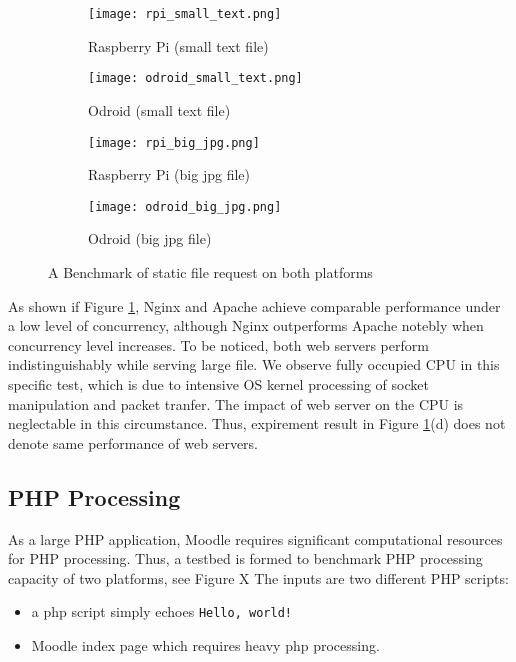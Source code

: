 \begin{figure}[h]
\centering
\begin{subfigure}{0.45\textwidth}
\centering
\texttt{[image: rpi\_small\_text.png]}
\caption{Raspberry Pi (small text file)}
\end{subfigure}
\begin{subfigure}{0.45\textwidth}
\centering
\texttt{[image: odroid\_small\_text.png]}
\caption{Odroid (small text file)}
\end{subfigure}

\begin{subfigure}{0.45\textwidth}
\centering
\texttt{[image: rpi\_big\_jpg.png]}
\caption{Raspberry Pi (big jpg file)}
\end{subfigure}
\begin{subfigure}{0.45\textwidth}
\centering
\texttt{[image: odroid\_big\_jpg.png]}
\caption{Odroid (big jpg file)}
\end{subfigure}
\caption{A Benchmark of static file request on both platforms}
\label{static}
\end{figure}

As shown if Figure \ref{static}, Nginx and Apache achieve comparable performance under a low level of concurrency, although Nginx outperforms Apache notebly when concurrency level increases. To be noticed, both web servers perform indistinguishably while serving large file. We observe fully occupied CPU in this specific test, which is due to intensive OS kernel processing of socket manipulation and packet tranfer. The impact of web server on the CPU is neglectable in this circumstance. Thus, expirement result in Figure \ref{static}(d) does not denote same performance of web servers.

\subsection{PHP Processing}
As a large PHP application, Moodle requires significant computational resources for PHP processing. Thus, a testbed is formed to benchmark PHP processing capacity of two platforms, see Figure X
The inputs are two different PHP scripts:
\begin{itemize}
\item a php script simply echoes \texttt{Hello, world!}
\item Moodle index page which requires heavy php processing.
\end{itemize}

